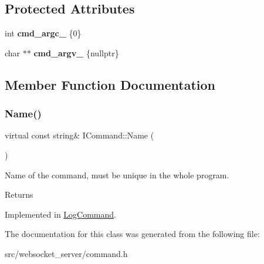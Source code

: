 \subsection*{Protected Attributes}
\begin{DoxyCompactItemize}
\item 
\mbox{\label{classICommand_a508aec4ae133993ea6fe37dae4aa221a}} 
int {\bfseries cmd\+\_\+argc\+\_\+} \{0\}
\item 
\mbox{\label{classICommand_a63dd8353c35720cc5ef5689e2938b96c}} 
char $\ast$$\ast$ {\bfseries cmd\+\_\+argv\+\_\+} \{nullptr\}
\end{DoxyCompactItemize}


\subsection{Member Function Documentation}
\mbox{\label{classICommand_aebdd4993acbba78855f1ace503786dfc}} 
\subsubsection{\texorpdfstring{Name()}{Name()}}
{\footnotesize\ttfamily virtual const string\& I\+Command\+::\+Name (\begin{DoxyParamCaption}{ }\end{DoxyParamCaption})\hspace{0.3cm}{\ttfamily [pure virtual]}}



Name of the command, must be unique in the whole program. 

\begin{DoxyReturn}{Returns}

\end{DoxyReturn}


Implemented in \hyperlink{classLogCommand_aba05f5a8920ce0526d22ecfd93ea5060}{Log\+Command}.



The documentation for this class was generated from the following file\+:\begin{DoxyCompactItemize}
\item 
src/websocket\+\_\+server/command.\+h\end{DoxyCompactItemize}
